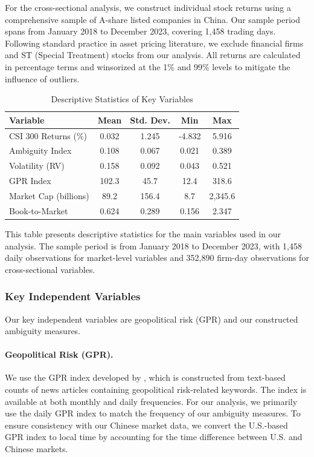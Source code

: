 \documentclass[preprint,12pt,authoryear]{elsarticle}
\begin{document}
For the cross-sectional analysis, we construct individual stock returns using a comprehensive sample of A-share listed companies in China. Our sample period spans from January 2018 to December 2023, covering 1,458 trading days. Following standard practice in asset pricing literature, we exclude financial firms and ST (Special Treatment) stocks from our analysis. All returns are calculated in percentage terms and winsorized at the 1\% and 99\% levels to mitigate the influence of outliers.

\begin{table}[htbp]
\centering
\caption{Descriptive Statistics of Key Variables}
\label{tab:descriptive_stats}
\begin{threeparttable}
\begin{tabular}{lcccc}
\toprule
Variable & Mean & Std. Dev. & Min & Max \\
\midrule
CSI 300 Returns (\%) & 0.032 & 1.245 & -4.832 & 5.916 \\
Ambiguity Index & 0.108 & 0.067 & 0.021 & 0.389 \\
Volatility (RV) & 0.158 & 0.092 & 0.043 & 0.521 \\
GPR Index & 102.3 & 45.7 & 12.4 & 318.6 \\
Market Cap (billions) & 89.2 & 156.4 & 8.7 & 2,345.6 \\
Book-to-Market & 0.624 & 0.289 & 0.156 & 2.347 \\
\bottomrule
\end{tabular}
\begin{tablenotes}
\small
\item This table presents descriptive statistics for the main variables used in our analysis. The sample period is from January 2018 to December 2023, with 1,458 daily observations for market-level variables and 352,890 firm-day observations for cross-sectional variables.
\end{tablenotes}
\end{threeparttable}
\end{table}

\subsubsection{Key Independent Variables}

Our key independent variables are geopolitical risk (GPR) and our constructed ambiguity measures.

\paragraph{Geopolitical Risk (GPR).}
We use the GPR index developed by \citet{caldara2022measuring}, which is constructed from text-based counts of news articles containing geopolitical risk-related keywords. The index is available at both monthly and daily frequencies. For our analysis, we primarily use the daily GPR index to match the frequency of our ambiguity measures. To ensure consistency with our Chinese market data, we convert the U.S.-based GPR index to local time by accounting for the time difference between U.S. and Chinese markets.
\end{document}
